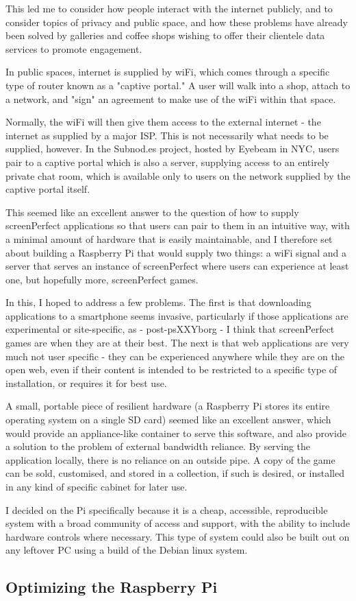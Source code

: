 This led me to consider how people interact with the internet publicly, and to consider topics of privacy and public space, and how these problems have already been solved by galleries and coffee shops wishing to offer their clientele data services to promote engagement.

In public spaces, internet is supplied by wiFi, which comes through a specific type of router known as a "captive portal." A user will walk into a shop, attach to a network, and "sign" an agreement to make use of the wiFi within that space.

Normally, the wiFi will then give them access to the external internet - the internet as supplied by a major ISP. This is not necessarily what needs to be supplied, however. In the Subnod.es project, hosted by Eyebeam in NYC, users pair to a captive portal which is also a server, supplying access to an entirely private chat room, which is available only to users on the network supplied by the captive portal itself.

This seemed like an excellent answer to the question of how to supply screenPerfect applications so that users can pair to them in an intuitive way, with a minimal amount of hardware that is easily maintainable, and I therefore set about building a Raspberry Pi that would supply two things: a wiFi signal and a server that serves an instance of screenPerfect where users can experience at least one, but hopefully more, screenPerfect games.

In this, I hoped to address a few problems. The first is that downloading applications to a smartphone seems invasive, particularly if those applications are experimental or site-specific, as - post-psXXYborg - I think that screenPerfect games are when they are at their best. The next is that web applications are very much not user specific - they can be experienced anywhere while they are on the open web, even if their content is intended to be restricted to a specific type of installation, or requires it for best use.

A small, portable piece of resilient hardware (a Raspberry Pi stores its entire operating system on a single SD card) seemed like an excellent answer, which would provide an appliance-like container to serve this software, and also provide a solution to the problem of external bandwidth reliance. By serving the application locally, there is no reliance on an outside pipe. A copy of the game can be sold, customised, and stored in a collection, if such is desired, or installed in any kind of specific cabinet for later use.

I decided on the Pi specifically because it is a cheap, accessible, reproducible system with a broad community of access and support, with the ability to include hardware controls where necessary. This type of system could also be built out on any leftover PC using a build of the Debian linux system.

\subsection{Optimizing the Raspberry Pi}






